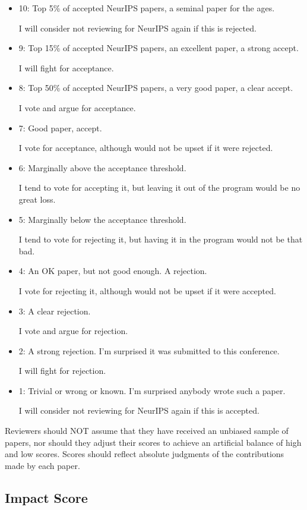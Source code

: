 \begin{itemize}
\item
  10: Top 5\% of accepted NeurIPS papers, a seminal paper for the ages.

  I will consider not reviewing for NeurIPS again if this is rejected.
\item
  9: Top 15\% of accepted NeurIPS papers, an excellent paper, a strong
  accept.

  I will fight for acceptance.
\item
  8: Top 50\% of accepted NeurIPS papers, a very good paper, a clear
  accept.

  I vote and argue for acceptance.
\item
  7: Good paper, accept.

  I vote for acceptance, although would not be upset if it were
  rejected.
\item
  6: Marginally above the acceptance threshold.

  I tend to vote for accepting it, but leaving it out of the program
  would be no great loss.
\item
  5: Marginally below the acceptance threshold.

  I tend to vote for rejecting it, but having it in the program would
  not be that bad.
\item
  4: An OK paper, but not good enough. A rejection.

  I vote for rejecting it, although would not be upset if it were
  accepted.
\item
  3: A clear rejection.

  I vote and argue for rejection.
\item
  2: A strong rejection. I'm surprised it was submitted to this
  conference.

  I will fight for rejection.
\item
  1: Trivial or wrong or known. I'm surprised anybody wrote such a
  paper.

  I will consider not reviewing for NeurIPS again if this is accepted.
\end{itemize}

Reviewers should NOT assume that they have received an unbiased sample
of papers, nor should they adjust their scores to achieve an artificial
balance of high and low scores. Scores should reflect absolute judgments
of the contributions made by each paper.

\hypertarget{impact-score}{%
\subsection{Impact Score}\label{impact-score}}

